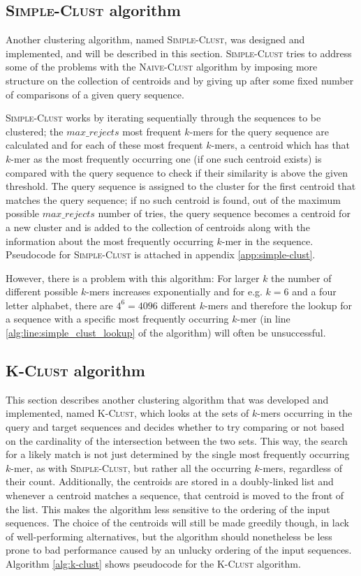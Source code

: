 \subsection{\textsc{Simple-Clust} algorithm}

Another clustering algorithm, named \textsc{Simple-Clust}, was designed and
implemented, and will be described in this section. \textsc{Simple-Clust} tries
to address some of the problems with the \textsc{Naive-Clust} algorithm by
imposing more structure on the collection of centroids and by giving up after
some fixed number of comparisons of a given query sequence.

\textsc{Simple-Clust} works by iterating sequentially through the sequences to
be clustered; the $max\_rejects$ most frequent $k$-mers for the query sequence
are calculated and for each of these most frequent $k$-mers, a centroid which
has that $k$-mer as the most frequently occurring one (if one such centroid
exists) is compared with the query sequence to check if their similarity is
above the given threshold. The query sequence is assigned to the cluster for
the first centroid that matches the query sequence; if no such centroid is
found, out of the maximum possible $max\_rejects$ number of tries, the query
sequence becomes a centroid for a new cluster and is added to the collection of
centroids along with the information about the most frequently occurring
$k$-mer in the sequence. Pseudocode for \textsc{Simple-Clust} is attached in
appendix \ref{app:simple-clust}.

However, there is a problem with this algorithm: For larger $k$ the number of
different possible $k$-mers increases exponentially and for e.g. $k = 6$ and a
four letter alphabet, there are $4^6 = 4096$ different $k$-mers and therefore
the lookup for a sequence with a specific most frequently occurring $k$-mer (in
line \ref{alg:line:simple_clust_lookup} of the algorithm) will often be
unsuccessful.


\subsection{\textsc{K-Clust} algorithm}
\label{sec:k-clust_algorithm}

This section describes another clustering algorithm that was developed and
implemented, named \textsc{K-Clust}, which looks at the sets of $k$-mers
occurring in the query and target sequences and decides whether to try
comparing or not based on the cardinality of the intersection between the two
sets. This way, the search for a likely match is not just determined by the
single most frequently occurring $k$-mer, as with \textsc{Simple-Clust}, but
rather all the occurring $k$-mers, regardless of their count. Additionally, the
centroids are stored in a doubly-linked list and whenever a centroid matches a
sequence, that centroid is moved to the front of the list. This makes the
algorithm less sensitive to the ordering of the input sequences. The choice of
the centroids will still be made greedily though, in lack of well-performing
alternatives, but the algorithm should nonetheless be less prone to bad
performance caused by an unlucky ordering of the input sequences. Algorithm
\ref{alg:k-clust} shows pseudocode for the \textsc{K-Clust} algorithm.

